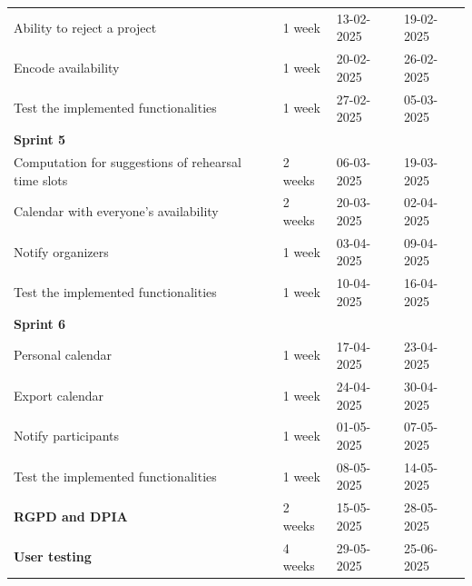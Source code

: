 \documentclass[11pt]{article}
\begin{document}
\begin{table}[htbp]
\begin{tabular}{| p{9cm} | p{2cm} | p{2.1cm} | p{2cm} |}
    \quad Ability to reject a project & 1 week & 13-02-2025 & 19-02-2025 \\
    \quad Encode availability & 1 week & 20-02-2025 & 26-02-2025 \\
    \quad Test the implemented functionalities & 1 week & 27-02-2025 & 05-03-2025\\
    \textbf{Sprint 5} &&&\\
    \quad Computation for suggestions of rehearsal time slots & 2 weeks & 06-03-2025 & 19-03-2025 \\
    \quad Calendar with everyone's availability & 2 weeks & 20-03-2025 & 02-04-2025 \\
    \quad Notify organizers & 1 week & 03-04-2025 & 09-04-2025 \\
    \quad Test the implemented functionalities & 1 week & 10-04-2025 & 16-04-2025\\
    \textbf{Sprint 6} &&&\\
    \quad Personal calendar & 1 week & 17-04-2025 & 23-04-2025 \\
    \quad Export calendar & 1 week & 24-04-2025 & 30-04-2025 \\
    \quad Notify participants & 1 week & 01-05-2025 & 07-05-2025 \\
    \quad Test the implemented functionalities & 1 week & 08-05-2025 & 14-05-2025\\
    \textbf{RGPD and DPIA} & 2 weeks & 15-05-2025 & 28-05-2025 \\
    \textbf{User testing} & 4 weeks & 29-05-2025 & 25-06-2025\\
    \hline
    \end{tabular}
\end{table}
\end{document}
